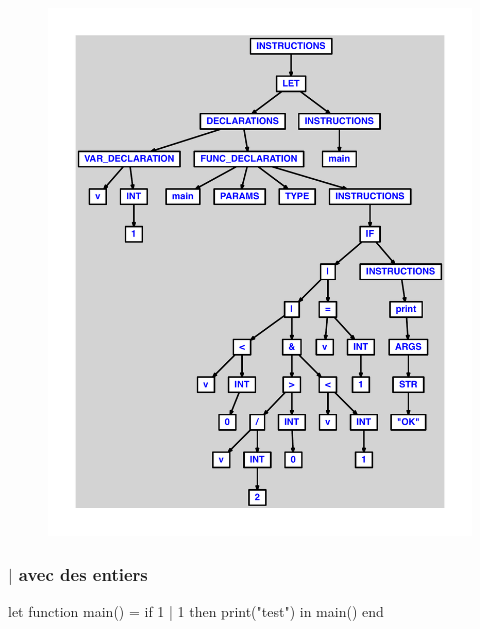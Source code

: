 \documentclass{article}
\begin{document}
\begin{figure}[H]\centering\includegraphics[max width=\textwidth]{ast/ast_276.pdf}\end{figure}\subsubsection{$ | $ avec des entiers}
\begin{verbatimtab}
let
	function main() =
		if 1 | 1 then print("test")
in main() end
\end{verbatimtab}
\end{document}
